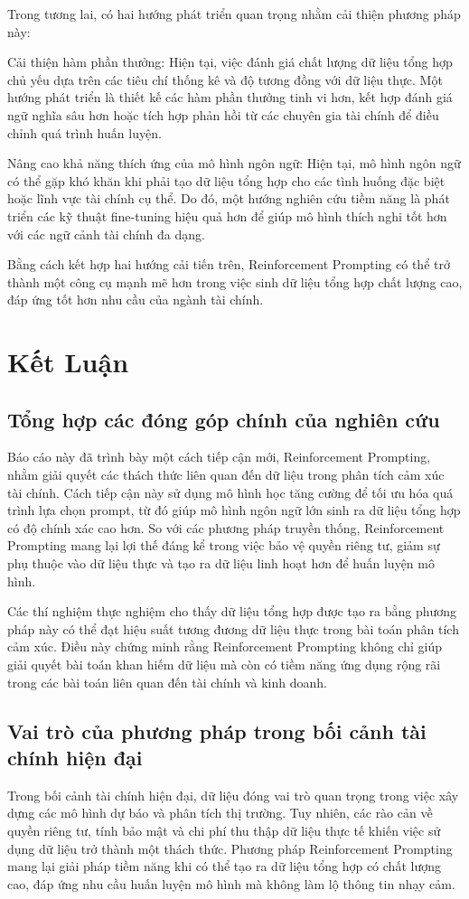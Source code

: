 \documentclass[a4paper,10pt]{article}
\begin{document}
Trong tương lai, có hai hướng phát triển quan trọng nhằm cải thiện phương pháp này:

Cải thiện hàm phần thưởng: Hiện tại, việc đánh giá chất lượng dữ liệu tổng hợp chủ yếu dựa trên các tiêu chí thống kê và độ tương đồng với dữ liệu thực. Một hướng phát triển là thiết kế các hàm phần thưởng tinh vi hơn, kết hợp đánh giá ngữ nghĩa sâu hơn hoặc tích hợp phản hồi từ các chuyên gia tài chính để điều chỉnh quá trình huấn luyện.

Nâng cao khả năng thích ứng của mô hình ngôn ngữ: Hiện tại, mô hình ngôn ngữ có thể gặp khó khăn khi phải tạo dữ liệu tổng hợp cho các tình huống đặc biệt hoặc lĩnh vực tài chính cụ thể. Do đó, một hướng nghiên cứu tiềm năng là phát triển các kỹ thuật fine-tuning hiệu quả hơn để giúp mô hình thích nghi tốt hơn với các ngữ cảnh tài chính đa dạng.

Bằng cách kết hợp hai hướng cải tiến trên, Reinforcement Prompting có thể trở thành một công cụ mạnh mẽ hơn trong việc sinh dữ liệu tổng hợp chất lượng cao, đáp ứng tốt hơn nhu cầu của ngành tài chính.
\section{Kết Luận}
\subsection{Tổng hợp các đóng góp chính của nghiên cứu}
Báo cáo này đã trình bày một cách tiếp cận mới, Reinforcement Prompting, nhằm giải quyết các thách thức liên quan đến dữ liệu trong phân tích cảm xúc tài chính. Cách tiếp cận này sử dụng mô hình học tăng cường để tối ưu hóa quá trình lựa chọn prompt, từ đó giúp mô hình ngôn ngữ lớn sinh ra dữ liệu tổng hợp có độ chính xác cao hơn. So với các phương pháp truyền thống, Reinforcement Prompting mang lại lợi thế đáng kể trong việc bảo vệ quyền riêng tư, giảm sự phụ thuộc vào dữ liệu thực và tạo ra dữ liệu linh hoạt hơn để huấn luyện mô hình.

Các thí nghiệm thực nghiệm cho thấy dữ liệu tổng hợp được tạo ra bằng phương pháp này có thể đạt hiệu suất tương đương dữ liệu thực trong bài toán phân tích cảm xúc. Điều này chứng minh rằng Reinforcement Prompting không chỉ giúp giải quyết bài toán khan hiếm dữ liệu mà còn có tiềm năng ứng dụng rộng rãi trong các bài toán liên quan đến tài chính và kinh doanh.
\subsection{Vai trò của phương pháp trong bối cảnh tài chính hiện đại}
Trong bối cảnh tài chính hiện đại, dữ liệu đóng vai trò quan trọng trong việc xây dựng các mô hình dự báo và phân tích thị trường. Tuy nhiên, các rào cản về quyền riêng tư, tính bảo mật và chi phí thu thập dữ liệu thực tế khiến việc sử dụng dữ liệu trở thành một thách thức. Phương pháp Reinforcement Prompting mang lại giải pháp tiềm năng khi có thể tạo ra dữ liệu tổng hợp có chất lượng cao, đáp ứng nhu cầu huấn luyện mô hình mà không làm lộ thông tin nhạy cảm.
\end{document}
